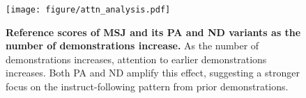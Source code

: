 \begin{figure}[t]
    \centering %

    {\texttt{[image: figure/attn\_analysis.pdf]}}
    \vspace{-0.3cm}
    \caption{\textbf{Reference scores of MSJ and its PA and ND variants as the number of demonstrations increase.} As the number of demonstrations increases, attention to earlier demonstrations increases. Both PA and ND amplify this effect, suggesting a stronger focus on the instruct-following pattern from prior demonstrations. } 
    \label{fig:attn_analysis}
    \vspace{-0.6cm}
\end{figure}


